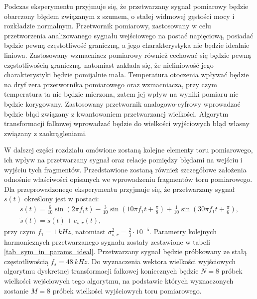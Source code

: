 Podczas eksperymentu przyjmuje się, że przetwarzany sygnał pomiarowy będzie obarczony błędem związanym z szumem, o stałej widmowej gęstości mocy i rozkładzie normalnym. Przetwornik pomiarowy, zastosowany w celu przetworzenia analizowanego sygnału wejściowego na postać napięciową, posiadać będzie pewną częstotliwość graniczną, a jego charakterystyka nie będzie idealnie liniowa. Zastosowany wzmacniacz pomiarowy również cechować się będzie pewną częstotliwością graniczną, natomiast zakłada się, że nieliniowość jego charakterystyki będzie pomijalnie mała. Temperatura otoczenia wpływać będzie na dryf zera przetwornika pomiarowego oraz wzmacniacza, przy czym temperatura ta nie będzie mierzona, zatem jej wpływ na wyniki pomiaru nie będzie korygowany. Zastosowany przetwornik analogowo-cyfrowy wprowadzać będzie błąd związany z kwantowaniem przetwarzanej wielkości. Algorytm transformacji falkowej wprowadzać będzie do wielkości wyjściowych błąd własny związany z zaokrągleniami.

W dalszej części rozdziału omówione zostaną kolejne elementy toru pomiarowego, ich wpływ na przetwarzany sygnał oraz relacje pomiędzy błędami na wejściu i wyjściu tych fragmentów. Przedstawione zostaną również szczegółowe założenia odnośnie właściwości opisanych we wprowadzeniu fragmentów toru pomiarowego. Dla przeprowadzonego eksperymentu przyjmuje się, że przetwarzany sygnał $s(t)$ określony jest w postaci:
\begin{gather}
\dot{s} \left( t \right) = \frac{6}{10} \sin \left( 2 \pi f_{1} t \right) - \frac{3}{10} \sin \left( 10 \pi f_{1} t + \frac{\pi}{8} \right) + \frac{1}{10} \sin \left( 30 \pi f_{1} t + \frac{\pi}{6} \right) \label{eqn_sym_in_ideal}, \\
\tilde{s} \left( t \right) = \dot{s} \left( t \right) + e_{s,r} \left( t \right) \label{eqn_sym_in_real},
\end{gather}
przy czym $f_{1} = \qty{1}{kHz}$, natomiast $\sigma_{s,r}^{2} = \frac{2}{3} \cdot 10^{-5}$. Parametry kolejnych harmonicznych przetwarzanego sygnału zostały zestawione w tabeli \ref{tab_sym_in_params_ideal}. Przetwarzany sygnał będzie próbkowany ze stałą częstotliwością $f_{s} = \qty{48}{kHz}$. Do wyznaczenia wektora wielkości wyjściowych algorytmu dyskretnej transformacji falkowej koniecznych będzie $N = 8$ próbek wielkości wejściowych tego algorytmu, na podstawie których wyznaczonych zostanie $M = 8$ próbek wielkości wyjściowych toru pomiarowego.

